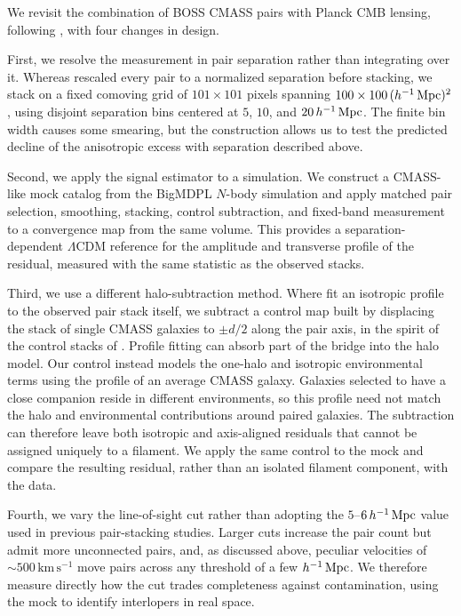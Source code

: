 We revisit the combination of BOSS CMASS pairs with Planck CMB lensing,
following \citet{deGraaff2019}, with four changes in design.

First, we resolve the measurement in pair separation rather than integrating
over it. Whereas \citet{deGraaff2019} rescaled every pair to a normalized
separation before stacking, we stack on a fixed comoving grid of
$101\times101$ pixels spanning $100\times100\,(h^{-1}\,{\rm Mpc})^{2}$, using disjoint
separation bins centered at $5$, $10$, and $20\,h^{-1}\,{\rm Mpc}$. The finite bin
width causes some smearing, but the construction allows us to test
the predicted decline of the anisotropic excess with separation described
above.

Second, we apply the signal estimator to a simulation. We construct a
CMASS-like mock catalog from the BigMDPL $N$-body simulation
\citep{Klypin2016} and apply matched pair selection, smoothing, stacking,
control subtraction, and fixed-band measurement to a convergence map from the
same volume. This provides a separation-dependent $\Lambda$CDM reference for
the amplitude and transverse profile of the residual, measured with the same
statistic as the observed stacks.

Third, we use a different halo-subtraction method. Where
\citet{deGraaff2019} fit an isotropic profile to the observed pair stack
itself, we subtract a control map built by displacing the stack of single
CMASS galaxies to $\pm d/2$ along the pair axis, in the spirit of the control
stacks of \citet{EppsHudson2017}. Profile fitting can absorb part of the
bridge into the halo model. Our control instead models the one-halo and
isotropic environmental terms using the profile of an average CMASS galaxy.
Galaxies selected to have a close companion reside in different environments,
so this profile need not match the halo and environmental contributions
around paired galaxies. The subtraction can therefore leave both isotropic
and axis-aligned residuals that cannot be assigned uniquely to a filament.
We apply the same control to the mock and compare the resulting residual,
rather than an isolated filament component, with the data.

Fourth, we vary the line-of-sight cut rather than adopting the
$5$--$6\,h^{-1}\,{\rm Mpc}$ value used in previous pair-stacking studies. Larger cuts
increase the pair count but admit more unconnected pairs, and, as discussed
above, peculiar velocities of $\sim500\,\mathrm{km\,s^{-1}}$ move pairs across
any threshold of a few $h^{-1}\,{\rm Mpc}$. We therefore measure directly how the cut
trades completeness against contamination, using the mock to identify
interlopers in real space.

